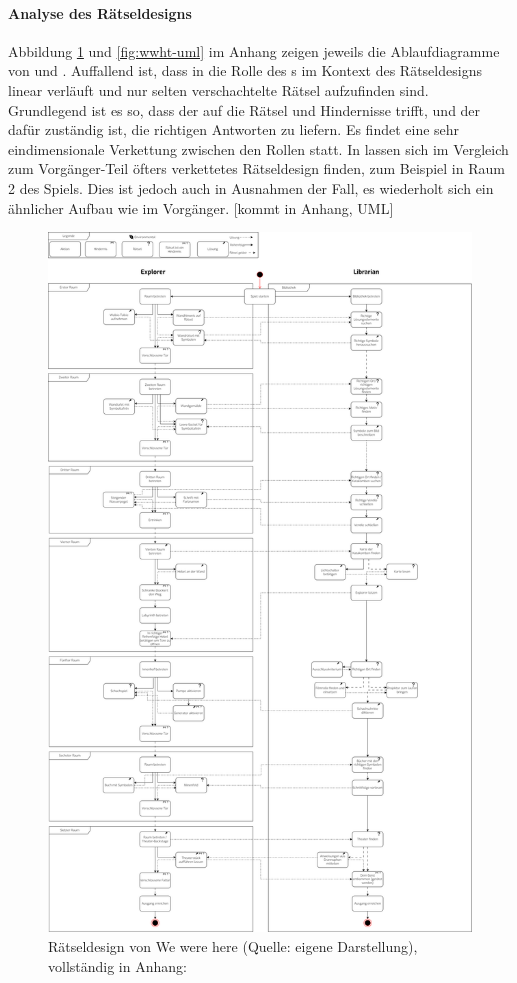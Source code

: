 \paragraph{Analyse des Rätseldesigns}
Abbildung \ref{fig:wwh-uml} und \ref{fig:wwht-uml} im Anhang zeigen jeweils die Ablaufdiagramme von  und . Auffallend ist, dass in  die Rolle des s im Kontext des Rätseldesigns linear verläuft und nur selten verschachtelte Rätsel aufzufinden sind. Grundlegend ist es so, dass der  auf die Rätsel und Hindernisse trifft, und der  dafür zuständig ist, die richtigen Antworten zu liefern. Es findet eine sehr eindimensionale Verkettung zwischen den Rollen statt.
In  lassen sich im Vergleich zum Vorgänger-Teil öfters verkettetes Rätseldesign finden, zum Beispiel in Raum 2 des Spiels. Dies ist jedoch auch in Ausnahmen der Fall, es wiederholt sich ein ähnlicher Aufbau wie im Vorgänger.
[kommt in Anhang, UML]

\begin{figure}[ht]
\centering
\includegraphics[width=0.8\linewidth]{content/pictures/WeWereHereUML.png}
\caption{Rätseldesign von We were here (Quelle: eigene Darstellung), vollständig in Anhang: }
\label{fig:wwh-uml}
\end{figure}

